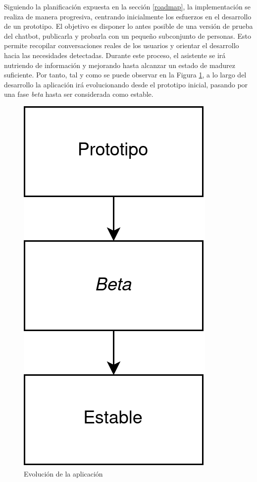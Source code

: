 Siguiendo la planificación expuesta en la sección \ref{roadmap}, la implementación se realiza de manera progresiva, centrando inicialmente los esfuerzos en el desarrollo de un prototipo. El objetivo es disponer lo antes posible de una versión de prueba del chatbot, publicarla y probarla  con un pequeño subconjunto de personas. Esto permite recopilar conversaciones reales de los usuarios y orientar el desarrollo hacia las necesidades detectadas. Durante este proceso, el asistente se irá nutriendo de información y mejorando hasta alcanzar un estado de madurez suficiente. Por tanto, tal y como se puede observar en la Figura \ref{fig:fasesApp}, a lo largo del desarrollo la aplicación irá evolucionando desde el prototipo inicial, pasando por una fase \textit{beta} hasta ser considerada como estable.\\  

\begin{figure}[htbp]
\centering
\includegraphics[scale=0.2]{../images/appStages.png}
\caption{Evolución de la aplicación}
\label{fig:fasesApp}
\end{figure}


